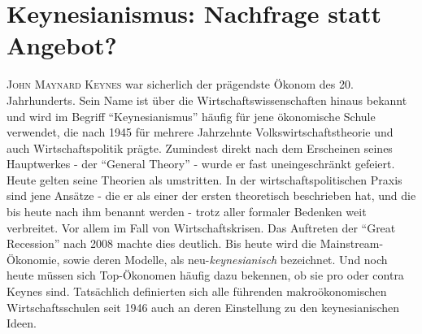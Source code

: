%
%
%

\chapter{Keynesianismus: Nachfrage statt Angebot?}
\label{Keynes}

\textsc{John Maynard Keynes} war sicherlich der prägendste Ökonom des 20. Jahrhunderts. Sein Name ist über die Wirtschaftswissenschaften hinaus bekannt und wird im Begriff "`Keynesianismus"' häufig für jene ökonomische Schule verwendet, die nach 1945 für mehrere Jahrzehnte Volkswirtschaftstheorie und auch Wirtschaftspolitik prägte. Zumindest direkt nach dem Erscheinen seines Hauptwerkes - der "`General Theory"' - wurde er fast uneingeschränkt gefeiert. Heute gelten seine Theorien als umstritten. In der wirtschaftspolitischen Praxis sind jene Ansätze - die er als einer der ersten theoretisch beschrieben hat, und die bis heute nach ihm benannt werden - trotz aller formaler Bedenken weit verbreitet. Vor allem im Fall von Wirtschaftskrisen. Das Auftreten der "`Great Recession"' nach 2008 machte dies deutlich. Bis heute wird die Mainstream-Ökonomie, sowie deren Modelle, als neu-\textit{keynesianisch} bezeichnet. Und noch heute müssen sich Top-Ökonomen häufig dazu bekennen, ob sie pro oder contra Keynes sind. Tatsächlich definierten sich alle führenden makroökonomischen Wirtschaftsschulen seit 1946 auch an deren Einstellung zu den keynesianischen Ideen.
